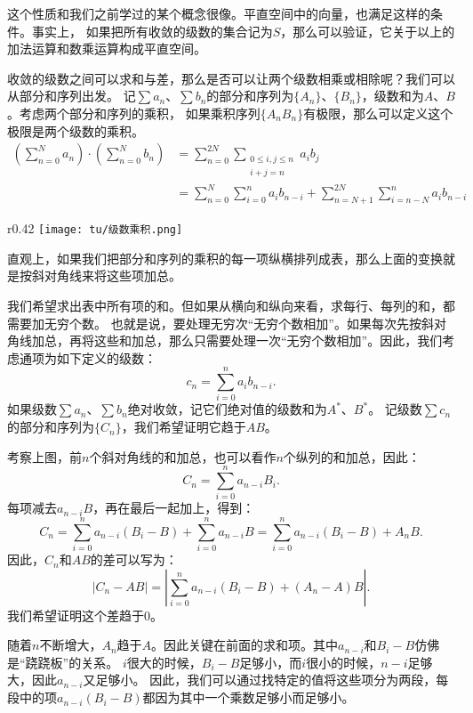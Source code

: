 \documentclass[12pt,UTF8]{ctexbook}
\begin{document}
这个性质和我们之前学过的某个概念很像。平直空间中的向量，也满足这样的条件。事实上，
如果把所有收敛的级数的集合记为$S$，那么可以验证，它关于以上的加法运算和数乘运算构成平直空间。

收敛的级数之间可以求和与差，那么是否可以让两个级数相乘或相除呢？我们可以从部分和序列出发。
记$\sum a_n$、$\sum b_n$的部分和序列为$\{A_n\}$、$\{B_n\}$，级数和为$A$、$B$。考虑两个部分和序列的乘积，
如果乘积序列$\{A_nB_n\}$有极限，那么可以定义这个极限是两个级数的乘积。
\begin{align*}
    \left(\sum_{n=0}^{N} a_n \right) \cdot \left(\sum_{n=0}^{N} b_n \right) &= \sum_{n=0}^{2N} \sum_{\substack{0\leqslant i,j \leqslant n \\ i+j=n}} a_i b_j \\
    &= \sum_{n=0}^{N} \sum_{i=0}^n a_i b_{n-i} + \sum_{n=N+1}^{2N} \sum_{i=n-N}^n a_i b_{n-i}
\end{align*}

\begin{wrapfigure}[5]{r}{0.42\textwidth} %
    \vspace{-32pt}
    \flushright
    \texttt{[image: tu/级数乘积.png]}
\end{wrapfigure}

直观上，如果我们把部分和序列的乘积的每一项纵横排列成表，那么上面的变换就是按斜对角线来将这些项加总。

我们希望求出表中所有项的和。但如果从横向和纵向来看，求每行、每列的和，都需要加无穷个数。
也就是说，要处理无穷次“无穷个数相加”。如果每次先按斜对角线加总，再将这些和加总，那么只需要处理一次“无穷个数相加”。因此，我们考虑通项为如下定义的级数：
$$ c_n = \sum_{i=0}^n a_i b_{n-i} . $$
如果级数$\sum a_n$、$\sum b_n$绝对收敛，记它们绝对值的级数和为$A^*$、$B^*$。
记级数$\sum c_n$的部分和序列为$\{C_n\}$，我们希望证明它趋于$AB$。

考察上图，前$n$个斜对角线的和加总，也可以看作$n$个纵列的和加总，因此：
$$C_n = \sum_{i=0}^{n} a_{n-i} B_i. $$
每项减去$a_{n-i}B$，再在最后一起加上，得到：
$$ C_n = \sum_{i=0}^{n} a_{n-i} (B_i - B) + \sum_{i=0}^n a_{n-i} B = \sum_{i=0}^{n} a_{n-i} (B_i - B) + A_n B. $$
因此，$C_n$和$AB$的差可以写为：
$$ |C_n - AB| = \left|\sum_{i=0}^{n} a_{n-i} (B_i - B) + (A_n - A) B \right|. $$
我们希望证明这个差趋于$0$。

随着$n$不断增大，$A_n$趋于$A$。因此关键在前面的求和项。其中$a_{n-i}$和$B_i - B$仿佛是“跷跷板”的关系。
$i$很大的时候，$B_i - B$足够小，而$i$很小的时候，$n-i$足够大，因此$a_{n-i}$又足够小。
因此，我们可以通过找特定的值将这些项分为两段，每段中的项$a_{n-i} (B_i - B)$都因为其中一个乘数足够小而足够小。
\end{document}
